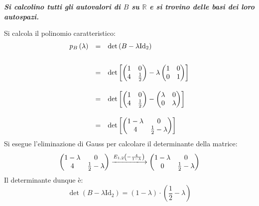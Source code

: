 \documentclass[a4paper]{article}
\makeatletter
\newenvironment{rowequmat}[1]{\left(\array{@{}#1@{}}}{\endarray\right)}
\makeatother
\begin{document}
	\textcolor{Green4}{\textbf{\emph{Si calcolino tutti gli autovalori di $B$ su $\mathbb{R}$ e si trovino delle basi dei loro autospazi.}}}\newline

	\noindent
	Si calcola il polinomio caratteristico:
	\begin{equation*}
		\begin{array}{lll}
			p_{B}\left(\lambda\right) &=& \det\left(B-\lambda \mathrm{Id}_{2}\right) \\ [2em]
			&=& \det\left[\begin{rowequmat}{cc}
				1 & 0 \\
				4 & \frac{1}{2}
			\end{rowequmat} - \lambda \begin{pmatrix}
				1 & 0 \\ 0 & 1
			\end{pmatrix}\right] \\ [2em]
			&=& \det\left[\begin{rowequmat}{cc}
				1 & 0 \\
				4 & \frac{1}{2}
			\end{rowequmat} - \begin{pmatrix}
				\lambda & 0 \\ 0 & \lambda
			\end{pmatrix}\right] \\ [2em]
			&=& \det\left[\begin{rowequmat}{cc}
				1-\lambda & 0 \\
				4 & \frac{1}{2}-\lambda
			\end{rowequmat}\right]
		\end{array}
	\end{equation*}
	Si esegue l'eliminazione di Gauss per calcolare il determinante della matrice:
	\begin{equation*}
		\begin{rowequmat}{cc}
			1-\lambda & 0 \\
			4 & \frac{1}{2}-\lambda
		\end{rowequmat}
		\xlongrightarrow{E_{1,2}\left(-\frac{4}{1-\lambda}\right)}
		\begin{rowequmat}{cc}
			1-\lambda & 0 \\
			0 & \frac{1}{2}-\lambda
		\end{rowequmat}
	\end{equation*}
	Il determinante dunque è:
	\begin{equation*}
		\det\left(B - \lambda\mathrm{Id}_{2}\right) = \left(1-\lambda\right) \cdot \left(\dfrac{1}{2}-\lambda\right)
	\end{equation*}
\end{document}
